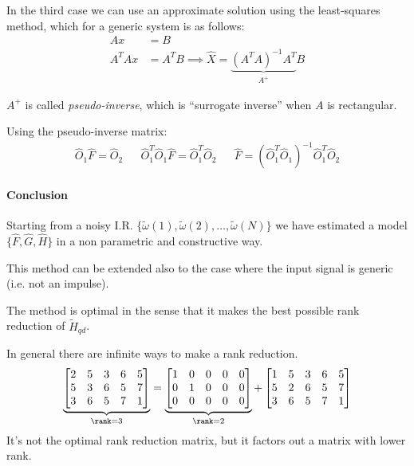 In the third case we can use an approximate solution using the least-squares method, which for a generic system is as follows:
\begin{align*}
    Ax &= B \\
    A^TAx &= A^TB \implies \hat{X} = \underbrace{(A^TA)^{-1}A^T}_{A^+} B
\end{align*}

$A^+$ is called \emph{pseudo-inverse}, which is ``surrogate inverse'' when $A$ is rectangular.

Using the pseudo-inverse matrix:
\begin{align*}
    \hat{O}_1\hat{F} = \hat{O}_2 &&
    \hat{O}_1^T\hat{O}_1\hat{F} = \hat{O}_1^T\hat{O}_2 &&
    \hat{F} = \left(\hat{O}_1^T\hat{O}_1\right)^{-1} \hat{O}_1^T\hat{O}_2
\end{align*}


\paragraph{Conclusion} Starting from a noisy I.R. $\{\widetilde{\omega}(1), \widetilde{\omega}(2), \ldots, \widetilde{\omega}(N)\}$ we have estimated a model $\{\hat{F}, \hat{G}, \hat{H}\}$ in a non parametric and constructive way.

\begin{rem}
    This method can be extended also to the case where the input signal is generic (i.e. not an impulse).
\end{rem}

\begin{rem}
    The method is optimal in the sense that it makes the best possible rank reduction of $\tilde{H}_{qd}$.
\end{rem}

\begin{exa}
    In general there are infinite ways to make a rank reduction.
    \[
        \underbrace{\begin{bmatrix}
            2 & 5 & 3 & 6 & 5 \\
            5 & 3 & 6 & 5 & 7 \\
            3 & 6 & 5 & 7 & 1
        \end{bmatrix}}_{\rank = 3}
        =
        \underbrace{\begin{bmatrix}
            1 & 0 & 0 & 0 & 0 \\
            0 & 1 & 0 & 0 & 0 \\
            0 & 0 & 0 & 0 & 0
        \end{bmatrix}}_{\rank = 2}
        +
        \begin{bmatrix}
            1 & 5 & 3 & 6 & 5 \\
            5 & 2 & 6 & 5 & 7 \\
            3 & 6 & 5 & 7 & 1
        \end{bmatrix}
    \]
    It's not the optimal rank reduction matrix, but it factors out a matrix with lower rank.
\end{exa}

